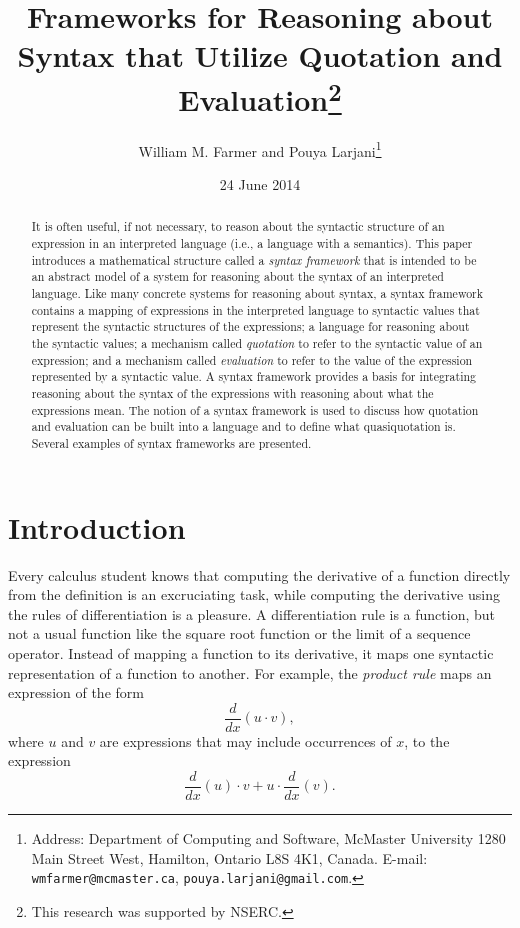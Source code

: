 \documentclass[11pt,fleqn]{article}
\title{{\bf Frameworks for Reasoning about Syntax that Utilize Quotation
  and Evaluation}\thanks{This research was supported by NSERC.}}
\author{William M. Farmer and Pouya Larjani\thanks{Address:
  Department of Computing and Software, McMaster University 1280 Main
  Street West, Hamilton, Ontario L8S 4K1, Canada. E-mail:
  \texttt{wmfarmer@mcmaster.ca}, \texttt{pouya.larjani@gmail.com}.}}
\date{24 June 2014}
\begin{document}
\maketitle

\begin{abstract}
It is often useful, if not necessary, to reason about the syntactic
structure of an expression in an interpreted language (i.e., a
language with a semantics).  This paper introduces a mathematical
structure called a \emph{syntax framework} that is intended to be an
abstract model of a system for reasoning about the syntax of an
interpreted language.  Like many concrete systems for reasoning about
syntax, a syntax framework contains a mapping of expressions in the
interpreted language to syntactic values that represent the syntactic
structures of the expressions; a language for reasoning about the
syntactic values; a mechanism called \emph{quotation} to refer to the
syntactic value of an expression; and a mechanism called
\emph{evaluation} to refer to the value of the expression represented
by a syntactic value.  A syntax framework provides a basis for
integrating reasoning about the syntax of the expressions with
reasoning about what the expressions mean.  The notion of a syntax
framework is used to discuss how quotation and evaluation can be built
into a language and to define what quasiquotation is.  Several
examples of syntax frameworks are presented.
\end{abstract}

\iffalse
\begin{keywords}
formal mathematics \sep
reasoning about syntax \sep
formal languages \sep
quotation \sep
evaluation \sep
quasiquotation
\end{keywords}
\fi

\newpage

\section{Introduction} \label{sec:intro}

Every calculus student knows that computing the derivative of a
function directly from the definition is an excruciating task, while
computing the derivative using the rules of differentiation is a
pleasure.  A differentiation rule is a function, but not a usual
function like the square root function or the limit of a sequence
operator.  Instead of mapping a function to its derivative, it maps
one syntactic representation of a function to another.  For example,
the \emph{product rule} maps an expression of the
form \[\frac{d}{dx}(u \cdot v),\] where $u$ and $v$ are expressions
that may include occurrences of $x$, to the
expression \[\frac{d}{dx}(u) \cdot v + u \cdot \frac{d}{dx}(v).\]
\end{document}
